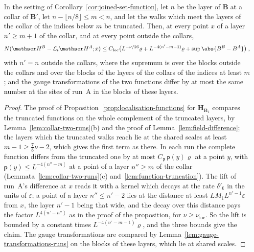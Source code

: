 \begin{lemma}\label{lem:joined-set-collar}
In the setting of Corollary~\ref{cor:joined-set-function}, let $n$ be the layer of $\mathbf B$ at a collar of $\mathbf B'$, let $n - \lfloor n/8\rfloor \leq m < n$, and let the walks which meet the layers of the collar of the indices below $m$ be truncated. Then, at every point $x$ of a layer $n' \geq m + 1$ of the collar, and at every point outside the collars,
\[
    N(\mathscr H^B - \mathcal L_\iota\mathscr H^A; x) \leq C_{\mathrm{loc}}\bigl(L^{-\nu/26}\varrho + L^{-4(n'-m-1)}\varrho + \sup\abs{B^B - B^A}\bigr)\;,
\]
with $n' = n$ outside the collars, where the supremum is over the blocks outside the collars and over the blocks of the layers of the collars of the indices at least $m$; and the gauge transformations \cite[(106)]{BalabanAVG} of the two functions differ by at most the same number at the sites of run~A in the blocks of these layers.
\end{lemma}

\begin{proof}
The proof of Proposition~\ref{prop:localisation-functions} for $\mathbf H_{\mathbf B_1}$ compares the truncated functions on the whole complement of the truncated layers, by Lemma~\ref{lem:collar-two-runs}(b) and the proof of Lemma~\ref{lem:field-difference}; the layers which the truncated walks reach lie at the shared scales at least $m - 1 \geq \frac{7}{8}\nu - 2$, which gives the first term as there. In each run the complete function differs from the truncated one by at most $C_{\mathsf p}\,\mathsf p(y)\varrho$ at a point $y$, with $\mathsf p(y) \leq L^{-4(n''-m)}$ at a point of a layer $n'' \geq m$ of the collar (Lemmata~\ref{lem:collar-two-runs}(c) and~\ref{lem:function-truncation}). The lift of run~A's difference at $x$ reads it with a kernel which decays at the rate $\delta'_0$ in the units of $\varepsilon$; a point of a layer $n'' \leq n' - 2$ lies at the distance at least $LM_1L^{n'-1}\varepsilon$ from $x$, the layer $n' - 1$ being that wide, and the decay over this distance pays the factor $L^{4(n'-n'')}$ as in the proof of the proposition, for $\nu \geq \nu_{\mathrm{loc}}$. So the lift is bounded by a constant times $L^{-4(n'-m-1)}\varrho$, and the three bounds give the claim. The gauge transformations are compared by Lemma~\ref{lem:gauge-transformations-runs} on the blocks of these layers, which lie at shared scales.
\end{proof}


